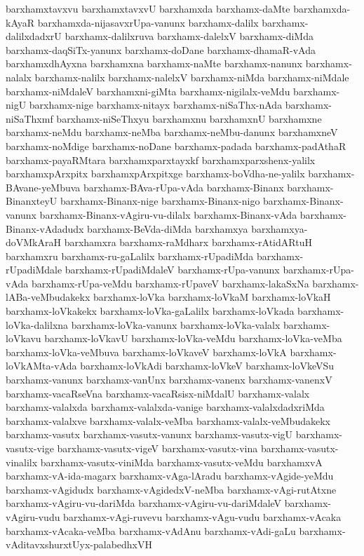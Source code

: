 {barxhamxtavxvu
barxhamxtavxvU
barxhamxda
barxhamx-daMte
barxhamxda-kAyaR
barxhamxda-nijasavxrUpa-vanunx
barxhamx-dalilx
barxhamx-dalilxdadxrU
barxhamx-dalilxruva
barxhamx-dalelxV
barxhamx-diMda
barxhamx-daqSiTx-yanunx
barxhamx-doDane
barxhamx-dhamaR-vAda
barxhamxdhAyxna
barxhamxna
barxhamx-naMte
barxhamx-nanunx
barxhamx-nalalx
barxhamx-nalilx
barxhamx-nalelxV
barxhamx-niMda
barxhamx-niMdale
barxhamx-niMdaleV
barxhamxni-giMta
barxhamx-nigilalx-veMdu
barxhamx-nigU
barxhamx-nige
barxhamx-nitayx
barxhamx-niSaThx-nAda
barxhamx-niSaThxmf
barxhamx-niSeThxyu
barxhamxnu
barxhamxnU
barxhamxne
barxhamx-neMdu
barxhamx-neMba
barxhamx-neMbu-danunx
barxhamxneV
barxhamx-noMdige
barxhamx-noDane
barxhamx-padada
barxhamx-padAthaR
barxhamx-payaRMtara
barxhamxparxtayxkf
barxhamxparxshenx-yalilx
barxhamxpArxpitx
barxhamxpArxpitxge
barxhamx-boVdha-ne-yalilx
barxhamx-BAvane-yeMbuva
barxhamx-BAva-rUpa-vAda
barxhamx-Binanx
barxhamx-BinanxteyU
barxhamx-Binanx-nige
barxhamx-Binanx-nigo
barxhamx-Binanx-vanunx
barxhamx-Binanx-vAgiru-vu-dilalx
barxhamx-Binanx-vAda
barxhamx-Binanx-vAdadudx
barxhamx-BeVda-diMda
barxhamxya
barxhamxya-doVMkAraH
barxhamxra
barxhamx-raMdharx
barxhamx-rAtidARtuH
barxhamxru
barxhamx-ru-gaLalilx
barxhamx-rUpadiMda
barxhamx-rUpadiMdale
barxhamx-rUpadiMdaleV
barxhamx-rUpa-vanunx
barxhamx-rUpa-vAda
barxhamx-rUpa-veMdu
barxhamx-rUpaveV
barxhamx-lakaSxNa
barxhamx-lABa-veMbudakekx
barxhamx-loVka
barxhamx-loVkaM
barxhamx-loVkaH
barxhamx-loVkakekx
barxhamx-loVka-gaLalilx
barxhamx-loVkada
barxhamx-loVka-dalilxna
barxhamx-loVka-vanunx
barxhamx-loVka-valalx
barxhamx-loVkavu
barxhamx-loVkavU
barxhamx-loVka-veMdu
barxhamx-loVka-veMba
barxhamx-loVka-veMbuva
barxhamx-loVkaveV
barxhamx-loVkA
barxhamx-loVkAMta-vAda
barxhamx-loVkAdi
barxhamx-loVkeV
barxhamx-loVkeVSu
barxhamx-vanunx
barxhamx-vanUnx
barxhamx-vanenx
barxhamx-vanenxV
barxhamx-vacaRseVna
barxhamx-vacaRsisx-niMdalU
barxhamx-valalx
barxhamx-valalxda
barxhamx-valalxda-vanige
barxhamx-valalxdadxriMda
barxhamx-valalxve
barxhamx-valalx-veMba
barxhamx-valalx-veMbudakekx
barxhamx-vasutx
barxhamx-vasutx-vanunx
barxhamx-vasutx-vigU
barxhamx-vasutx-vige
barxhamx-vasutx-vigeV
barxhamx-vasutx-vina
barxhamx-vasutx-vinalilx
barxhamx-vasutx-viniMda
barxhamx-vasutx-veMdu
barxhamxvA
barxhamx-vA-ida-magarx
barxhamx-vAga-lAradu
barxhamx-vAgide-yeMdu
barxhamx-vAgidudx
barxhamx-vAgidedxV-neMba
barxhamx-vAgi-rutAtxne
barxhamx-vAgiru-vu-dariMda
barxhamx-vAgiru-vu-dariMdaleV
barxhamx-vAgiru-vudu
barxhamx-vAgi-ruvevu
barxhamx-vAgu-vudu
barxhamx-vAcaka
barxhamx-vAcaka-veMba
barxhamx-vAdAnu
barxhamx-vAdi-gaLu
barxhamx-vAditavxshurxtUyx-palabedhxVH
}
